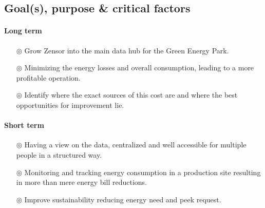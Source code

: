\subsection{Goal(s), purpose \& critical factors}
\paragraph{Long term}
\begin{itemize}
    \item[$\circledcirc$] Grow Zensor into the main data hub for the Green Energy Park.
    \item[$\circledcirc$] Minimizing the energy losses and overall consumption, leading to a more profitable operation.
    \item[$\circledcirc$] Identify where the exact sources of this cost are and where the best opportunities for improvement lie.
\end{itemize}
\paragraph{Short term}
\begin{itemize}
    \item[$\circledcirc$] Having a view on the data, centralized and well accessible for multiple people in a structured way.
    \item[$\circledcirc$] Monitoring and tracking energy consumption in a production site resulting in more than mere energy bill reductions.
    \item[$\circledcirc$] Improve sustainability reducing energy need and peek request. 
\end{itemize}

